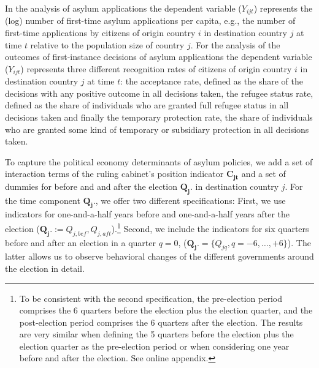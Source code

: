\documentclass[a4paper,12pt]{article}
\begin{document}

In the analysis of asylum applications the dependent variable ($Y_{ijt}$) represents the (log) number of first-time asylum applications per capita, e.g., the number of first-time applications by citizens of origin country $i$ in destination country $j$ at time $t$ relative to the population size of country $j$. For the analysis of the outcomes of first-instance decisions of asylum applications the dependent variable ($Y_{ijt}$) represents three different recognition rates of citizens of origin country $i$ in destination country $j$ at time $t$: the acceptance rate, defined as the share of the decisions with any positive outcome in all decisions taken, the refugee status rate, defined as the share of individuals who are granted full refugee status in all decisions taken and finally the temporary protection rate, the share of individuals who are granted some kind of temporary or subsidiary protection in all decisions taken. 

To capture the political economy determinants of asylum policies, we add a set of interaction terms of the ruling cabinet's position indicator $\mathbf{C_{jt}}$ and  a set of dummies for before and and after the election $\mathbf{Q_j.}$ in destination country $j$. For the time component $\mathbf{Q_j.}$, we offer two different specifications: First, we use indicators for one-and-a-half years before and one-and-a-half years after the election ($\mathbf{Q_j.} := Q_{j,bef},  Q_{j,aft}$).\footnote{To be consistent with the second specification, the pre-election period comprises the 6 quarters before the election plus the election quarter, and the post-election period comprises the 6 quarters after the election. The results are very similar when defining the 5 quarters before the election plus the election quarter as the pre-election period or when considering one year before and after the election. See online appendix.
} Second, we include the indicators for six quarters before and after an election in a quarter $q=0$, ($\mathbf{Q_j.} =\{Q_{jq}, q = -6, \ldots, +6\}$). The latter allows us to observe behavioral changes of the different governments around the election in detail.
\end{document}
